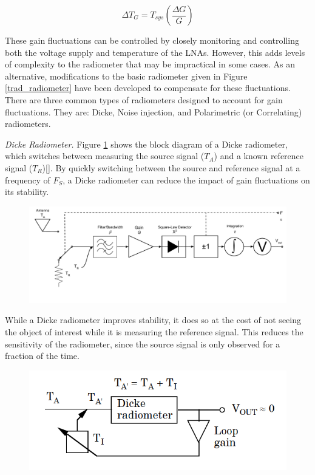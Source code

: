 \begin{equation} \label{eq:rad_stability}
\Delta T_G=T_{sys} \left(\frac{\Delta G}{G}\right)
\end{equation}

These gain fluctuations can be controlled by closely monitoring and controlling both the voltage supply and temperature of the LNAs. However, this adds levels of complexity to the radiometer that may be impractical in some cases.  As an alternative, modifications to the basic radiometer given in Figure \ref{trad_radiometer} have been developed to compensate for these fluctuations.  There are three common types of radiometers designed to account for gain fluctuations.  They are: Dicke, Noise injection, and Polarimetric (or Correlating) radiometers.

\emph{Dicke Radiometer.}  Figure \ref{dicke_radiometer} shows the block diagram of a Dicke radiometer, which switches between measuring the source signal ($T_A$) and a known reference signal ($T_R$)[\cite{Dicke}].  By quickly switching between the source and reference signal at a frequency of $F_S$, a Dicke radiometer can reduce the impact of gain fluctuations on its stability.  

{\begin{figure}[h!tb] 
\centering
\includegraphics[width=\textwidth]{Images/Dicke_Radiometer.pdf}
\label{dicke_radiometer}
\end{figure}
}

While a Dicke radiometer improves stability, it does so at the cost of not seeing the object of interest while it is measuring the reference signal.  This reduces the sensitivity of the radiometer, since the source signal is only observed for a fraction of the time.

{\begin{figure}[h!tb] 
\centering
\includegraphics[width=\textwidth]{Images/NoiseInj_block.png}
\label{NoiseInj_radiometer}
\end{figure}
}


